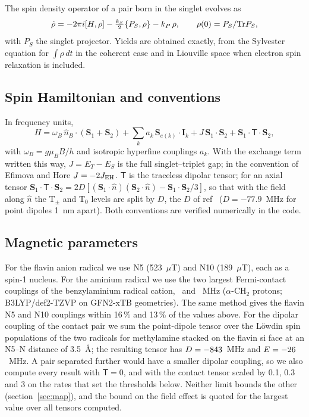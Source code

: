 \documentclass[journal=jpcbfk,manuscript=article,layout=traditional]{achemso}
\begin{document}
The spin density operator of a pair born in the singlet evolves as
\begin{equation}
\dot\rho = -2\pi i[H,\rho] - \tfrac{k_S}{2}\{P_S,\rho\} - k_P\,\rho ,
\qquad \rho(0) = P_S/{\rm Tr}P_S ,
\label{eq:me}
\end{equation}
with $P_S$ the singlet projector. Yields are obtained exactly, from the
Sylvester equation for $\int\rho\,dt$ in the coherent case and in Liouville space
when electron spin relaxation is included.

\subsection{Spin Hamiltonian and conventions}

In frequency units,
\begin{equation}
H = \omega_B\,\hat n_B\!\cdot(\mathbf S_1+\mathbf S_2)
  + \sum_k a_k\,\mathbf S_{e(k)}\!\cdot\!\mathbf I_k
  + J\,\mathbf S_1\!\cdot\!\mathbf S_2
  + \mathbf S_1\!\cdot\mathsf T\cdot\mathbf S_2 ,
\label{eq:H}
\end{equation}
with $\omega_B = g\mu_BB/h$ and isotropic hyperfine couplings $a_k$. With the
exchange term written this way, $J = E_T - E_S$ is the full singlet--triplet
gap; in the convention of Efimova and Hore\cite{Efimova2008}
$J = -2J_{\rm EH}$. $\mathsf T$ is the traceless dipolar tensor; for an axial
tensor $\mathbf S_1\!\cdot\mathsf T\cdot\mathbf S_2 =
2D[(\mathbf S_1\!\cdot\hat n)(\mathbf S_2\!\cdot\hat n) - \mathbf S_1\!\cdot\mathbf S_2/3]$,
so that with the field along $\hat n$ the T$_\pm$ and T$_0$ levels are split by
$D$, the $D$ of ref~ ($D = -77.9$~MHz for point dipoles
1~nm apart). Both conventions are verified numerically in the code.

\subsection{Magnetic parameters}

For the flavin anion radical we use N5 (523~$\mu$T) and N10 (189~$\mu$T), each
as a spin-1 nucleus.\cite{Lee2014} For the aminium radical we use the two
largest Fermi-contact couplings of the benzylaminium radical cation,
\aBenzOne\ and \aBenzTwo~MHz ($\alpha$-CH$_2$ protons; B3LYP/def2-TZVP on
GFN2-xTB geometries\cite{Bannwarth2019}). The same method gives the flavin N5
and N10 couplings within 16\,\% and 13\,\% of the values above. For the dipolar
coupling of the contact pair we sum the point-dipole tensor over the Löwdin spin
populations of the two radicals for methylamine stacked on the flavin si face
at an N5--N distance of 3.5~\AA; the resulting tensor has $D = -843$~MHz
and $E = -26$~MHz. A pair separated further would have a smaller dipolar
coupling, so we also compute every result with $\mathsf T = 0$, and with the
contact tensor scaled by 0.1, 0.3 and 3 on the rates that set the thresholds
below. Neither limit bounds the other (section~\ref{sec:map}), and the bound on
the field effect is quoted for the largest value over all tensors computed.
\end{document}

